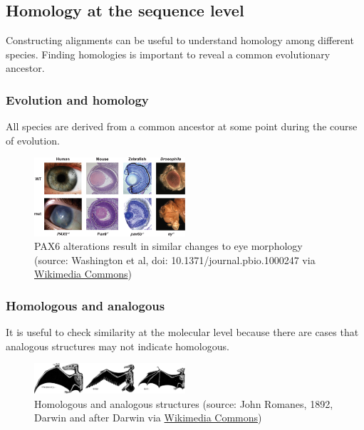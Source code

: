 %
%

%
%
\subsection{Homology at the sequence level}
Constructing alignments can be useful to understand homology among different species. Finding homologies is important to reveal a common evolutionary ancestor.

%
%
\subsubsection*{Evolution and homology}
All species are derived from a common ancestor at some point during the course of evolution.
 
\begin{figure}[H]
  \centering
      \includegraphics[width=0.5\textwidth]{fig03/PAX6_mutation.png}
  \caption{PAX6 alterations result in similar changes to eye morphology \newline (source: Washington et al, doi: 10.1371/journal.pbio.1000247 via \href{https://commons.wikimedia.org/w/index.php?curid=8626896}{Wikimedia Commons})}
\end{figure}

%
%
\subsubsection*{Homologous and  analogous}
It is useful to check similarity at the molecular level because there are cases that analogous structures may not indicate homologous. 
\begin{figure}[H]
  \centering
      \includegraphics[width=0.5\textwidth]{fig03/analogous.png}
  \caption{Homologous and  analogous structures \newline (source: John Romanes, 1892, Darwin and after Darwin via \href{https://commons.wikimedia.org/w/index.php?curid=1324636}{Wikimedia Commons})}
\end{figure}

